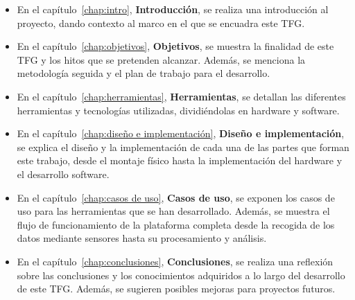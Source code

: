 \documentclass[a4paper, 12pt, oneside]{book}
\begin{document}
\begin{itemize}
\item En el capítulo~\ref{chap:intro}, \textbf{Introducción}, se realiza una introducción al proyecto, dando contexto al marco en el que se encuadra este TFG.

\item En el capítulo~\ref{chap:objetivos}, \textbf{Objetivos}, se muestra la finalidad de este TFG y los hitos que se pretenden alcanzar. Además, se menciona la metodología seguida y el plan de trabajo para el desarrollo.

\item En el capítulo~\ref{chap:herramientas}, \textbf{Herramientas}, se detallan las diferentes herramientas y tecnologías utilizadas, dividiéndolas en hardware y software.

\item En el capítulo~\ref{chap:diseño e implementación}, \textbf{Diseño e implementación}, se explica el diseño y la implementación de cada una de las partes que forman este trabajo, desde el montaje físico hasta la implementación del hardware y el desarrollo software.

\item En el capítulo~\ref{chap:casos de uso}, \textbf{Casos de uso}, se exponen los casos de uso para las herramientas que se han desarrollado. Además, se muestra el flujo de funcionamiento de la plataforma completa desde la recogida de los datos mediante sensores hasta su procesamiento y análisis.

\item En el capítulo~\ref{chap:conclusiones}, \textbf{Conclusiones},  se realiza una reflexión sobre las conclusiones y los conocimientos adquiridos a lo largo del desarrollo de este TFG. Además, se sugieren posibles mejoras para proyectos futuros.
\end{itemize}

%
%
%  
%  
%  
\end{document}
